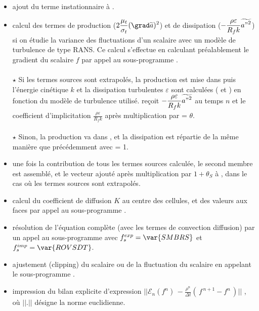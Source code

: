 \begin{itemize}
\item ajout du terme instationnaire \`{a} .

\item calcul des termes de production ($2
\displaystyle\frac{\mu_t}{\sigma_t}(\grad \widetilde{a})^2$) et de dissipation
($\displaystyle - \frac{\rho
\varepsilon}{R_f k}\widetilde{{a"}^2}$) si on \'{e}tudie la variance des
fluctuations d'un scalaire avec un mod\`{e}le de turbulence de type
RANS. Ce calcul s'effectue en calculant pr\'{e}alablement
le gradient du scalaire $f$ par appel au sous-programme .
\\\\
$\star$ Si les termes sources sont extrapol\'{e}s, la production est mise dans
 puis l'\'{e}nergie cin\'{e}tique $k$ et la dissipation turbulentes
$\varepsilon$ sont calcul\'{e}es ( et ) en
fonction du mod\`{e}le de turbulence utilis\'{e}.  reçoit
$\displaystyle - \frac{\rho \varepsilon}{R_f k}\widetilde{{a"}^2}$ au temps $n$
et  le coefficient d'implicitation
$\displaystyle \frac{\rho \varepsilon}{R_f k}$ apr\`{e}s multiplication par
 = $\theta$.
\\\\
$\star$ Sinon, la production va dans , et la dissipation est r\'{e}partie
de la m\^eme mani\`{e}re que pr\'{e}c\'{e}demment avec  = 1.
\\
\item une fois la contribution de tous les termes sources calcul\'{e}e, le second
membre est assembl\'{e}, et le vecteur  ajout\'{e} apr\`{e}s multiplication par
$1+\theta_S$ \`{a} , dans le cas o\`{u} les termes sources sont extrapol\'{e}s.

\item calcul du coefficient de diffusion $K$ au centre des cellules, et des
valeurs aux faces par appel au sous-programme .

\item r\'{e}solution de l'\'{e}quation compl\`{e}te (avec les termes de convection
diffusion) par un appel au sous-programme  avec
$f_s^{exp}=\var{SMBRS}$ et $f_s^{imp}=\var{ROVSDT}$.

\item ajustement (clipping) du scalaire ou de la fluctuation du scalaire en
appelant le sous-programme .

\item impression du bilan explicite d'expression
$||\mathcal{E}_{n}(f^n)\,- \displaystyle \frac {\rho^n}{\Delta t} (\,f^{\,n+1} -
f^n\,)|| $ , o\`u $|| . ||$ d\'esigne la norme euclidienne.
\\\\
\end{itemize}

